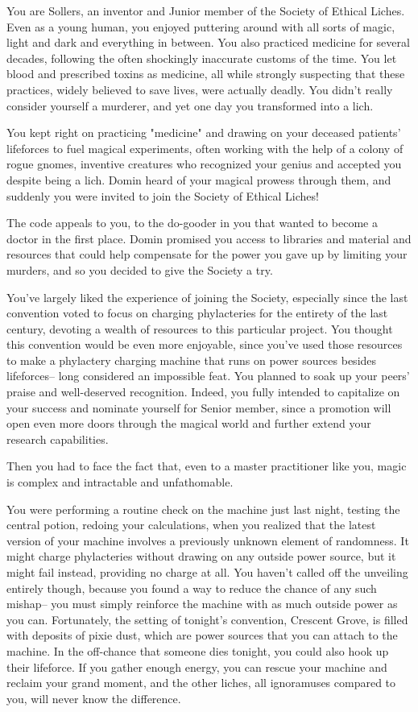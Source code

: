 \documentclass[char]{Sel}
\begin{document}
\name{\cSollers{}}
You are Sollers, an inventor and Junior member of the Society of Ethical Liches. Even as a young human, you enjoyed puttering around with all sorts of magic, light and dark and everything in between. You also practiced medicine for several decades, following the often shockingly inaccurate customs of the time. You let blood and prescribed toxins as medicine, all while strongly suspecting that these practices, widely believed to save lives, were actually deadly. You didn't really consider yourself a murderer, and yet one day you transformed into a lich.

You kept right on practicing "medicine" and drawing on your deceased patients' lifeforces to fuel magical experiments, often working with the help of a colony of rogue gnomes, inventive creatures who recognized your genius and accepted you despite being a lich. Domin heard of your magical prowess through them, and suddenly you were invited to join the Society of Ethical Liches!

The code appeals to you, to the do-gooder in you that wanted to become a doctor in the first place. Domin promised you access to libraries and material and resources that could help compensate for the power you gave up by limiting your murders, and so you decided to give the Society a try. 

You've largely liked the experience of joining the Society, especially since the last convention voted to focus on charging phylacteries for the entirety of the last century, devoting a wealth of resources to this particular project. You thought this convention would be even more enjoyable, since you've used those resources to make a phylactery charging machine that runs on power sources besides lifeforces-- long considered an impossible feat. You planned to soak up your peers' praise and well-deserved recognition. Indeed, you fully intended to capitalize on your success and nominate yourself for Senior member, since a promotion will open even more doors through the magical world and further extend your research capabilities.

Then you had to face the fact that, even to a master practitioner like you, magic is complex and intractable and unfathomable.

You were performing a routine check on the machine just last night, testing the central potion, redoing your calculations, when you realized that the latest version of your machine involves a previously unknown element of randomness. It might charge phylacteries without drawing on any outside power source, but it might fail instead, providing no charge at all. You haven't called off the unveiling entirely though, because you found a way to reduce the chance of any such mishap-- you must simply reinforce the machine with as much outside power as you can. Fortunately, the setting of tonight's convention, Crescent Grove, is filled with deposits of pixie dust, which are power sources that you can attach to the machine. In the off-chance that someone dies tonight, you could also hook up their lifeforce. If you gather enough energy, you can rescue your machine and reclaim your grand moment, and the other liches, all ignoramuses compared to you, will never know the difference.
\end{document}

